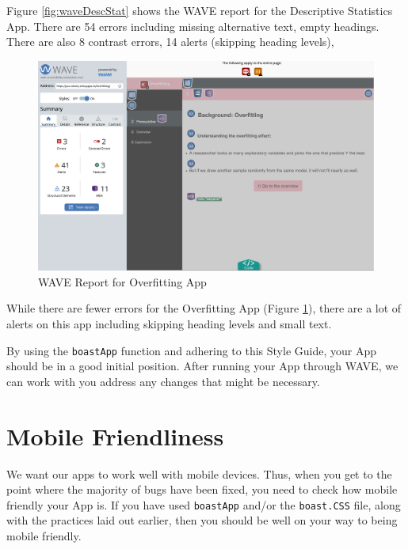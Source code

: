 \documentclass[
]{book}
\begin{document}
Figure \ref{fig:waveDescStat} shows the WAVE report for the Descriptive Statistics App. There are 54 errors including missing alternative text, empty headings. There are also 8 contrast errors, 14 alerts (skipping heading levels),

\begin{figure}

{\centering \includegraphics[width=19.69in]{images/overfitPrereq} 

}

\caption{WAVE Report for Overfitting App}\label{fig:waveOverfit}
\end{figure}

While there are fewer errors for the Overfitting App (Figure \ref{fig:waveOverfit}), there are a lot of alerts on this app including skipping heading levels and small text.

By using the \texttt{boastApp} function and adhering to this Style Guide, your App should be in a good initial position. After running your App through WAVE, we can work with you address any changes that might be necessary.

\hypertarget{mobile}{%
\chapter{Mobile Friendliness}\label{mobile}}

We want our apps to work well with mobile devices. Thus, when you get to the point where the majority of bugs have been fixed, you need to check how mobile friendly your App is. If you have used \texttt{boastApp} and/or the \texttt{boast.CSS} file, along with the practices laid out earlier, then you should be well on your way to being mobile friendly.
\end{document}
